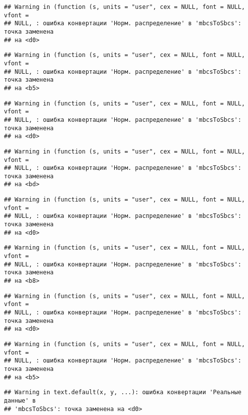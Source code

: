 \documentclass[
]{article}
\begin{document}
\begin{verbatim}
## Warning in (function (s, units = "user", cex = NULL, font = NULL, vfont =
## NULL, : ошибка конвертации 'Норм. распределение' в 'mbcsToSbcs': точка заменена
## на <d0>
\end{verbatim}

\begin{verbatim}
## Warning in (function (s, units = "user", cex = NULL, font = NULL, vfont =
## NULL, : ошибка конвертации 'Норм. распределение' в 'mbcsToSbcs': точка заменена
## на <b5>
\end{verbatim}

\begin{verbatim}
## Warning in (function (s, units = "user", cex = NULL, font = NULL, vfont =
## NULL, : ошибка конвертации 'Норм. распределение' в 'mbcsToSbcs': точка заменена
## на <d0>
\end{verbatim}

\begin{verbatim}
## Warning in (function (s, units = "user", cex = NULL, font = NULL, vfont =
## NULL, : ошибка конвертации 'Норм. распределение' в 'mbcsToSbcs': точка заменена
## на <bd>
\end{verbatim}

\begin{verbatim}
## Warning in (function (s, units = "user", cex = NULL, font = NULL, vfont =
## NULL, : ошибка конвертации 'Норм. распределение' в 'mbcsToSbcs': точка заменена
## на <d0>
\end{verbatim}

\begin{verbatim}
## Warning in (function (s, units = "user", cex = NULL, font = NULL, vfont =
## NULL, : ошибка конвертации 'Норм. распределение' в 'mbcsToSbcs': точка заменена
## на <b8>
\end{verbatim}

\begin{verbatim}
## Warning in (function (s, units = "user", cex = NULL, font = NULL, vfont =
## NULL, : ошибка конвертации 'Норм. распределение' в 'mbcsToSbcs': точка заменена
## на <d0>
\end{verbatim}

\begin{verbatim}
## Warning in (function (s, units = "user", cex = NULL, font = NULL, vfont =
## NULL, : ошибка конвертации 'Норм. распределение' в 'mbcsToSbcs': точка заменена
## на <b5>
\end{verbatim}

\begin{verbatim}
## Warning in text.default(x, y, ...): ошибка конвертации 'Реальные данные' в
## 'mbcsToSbcs': точка заменена на <d0>
\end{verbatim}
\end{document}
